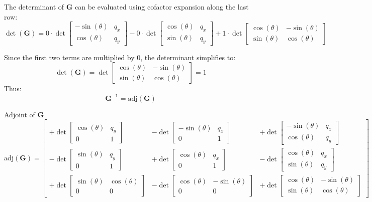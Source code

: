\documentclass{article}
\begin{document}
The determinant of \( \bm{\mathbf{G}} \) can be evaluated using cofactor expansion along the last row:
\[
\det(\bm{\mathbf{G}}) = 0 \cdot \det \begin{bmatrix} -\sin(\theta) & q_x \\ \cos(\theta) & q_y \end{bmatrix} 
- 0 \cdot \det \begin{bmatrix} \cos(\theta) & q_x \\ \sin(\theta) & q_y \end{bmatrix} 
+ 1 \cdot \det \begin{bmatrix} \cos(\theta) & -\sin(\theta) \\ \sin(\theta) & \cos(\theta) \end{bmatrix}
\]

Since the first two terms are multiplied by 0, the determinant simplifies to:
\[
\det(\bm{\mathbf{G}}) = \det \begin{bmatrix} \cos(\theta) & -\sin(\theta) \\ \sin(\theta) & \cos(\theta) \end{bmatrix} = 1
\]
Thus:
\[
\bm{\mathbf{G^{-1}}} = \text{adj}(\bm{\mathbf{G}})
\]

Adjoint of \( \bm{\mathbf{G}} \)
\[
\text{adj}(\bm{\mathbf{G}}) = \begin{bmatrix}
+ \det\begin{bmatrix} \cos(\theta) & q_y \\ 0 & 1 \end{bmatrix} & - \det\begin{bmatrix} -\sin(\theta) & q_x \\ 0 & 1 \end{bmatrix} & + \det\begin{bmatrix} -\sin(\theta) & q_x \\ \cos(\theta) & q_y \end{bmatrix} \\
- \det\begin{bmatrix} \sin(\theta) & q_y \\ 0 & 1 \end{bmatrix} & + \det\begin{bmatrix} \cos(\theta) & q_x \\ 0 & 1 \end{bmatrix} & - \det\begin{bmatrix} \cos(\theta) & q_x \\ \sin(\theta) & q_y \end{bmatrix} \\
+ \det\begin{bmatrix} \sin(\theta) & \cos(\theta) \\ 0 & 0 \end{bmatrix} & - \det\begin{bmatrix} \cos(\theta) & -\sin(\theta) \\ 0 & 0 \end{bmatrix} & + \det\begin{bmatrix} \cos(\theta) & -\sin(\theta) \\ \sin(\theta) & \cos(\theta) \end{bmatrix}
\end{bmatrix}
\]
\end{document}
